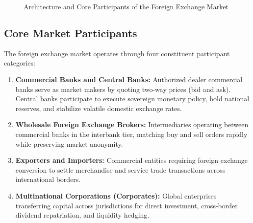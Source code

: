 \begin{figure}[htbp]
{%
    }
    \caption{Architecture and Core Participants of the Foreign Exchange Market}
    \label{fig:forex_market_structure}
\end{figure}

\subsection{Core Market Participants}
The foreign exchange market operates through four constituent participant categories:
\begin{enumerate}[leftmargin=*]
    \item \textbf{Commercial Banks and Central Banks:} Authorized dealer commercial banks serve as market makers by quoting two-way prices (bid and ask). Central banks participate to execute sovereign monetary policy, hold national reserves, and stabilize volatile domestic exchange rates.
    \item \textbf{Wholesale Foreign Exchange Brokers:} Intermediaries operating between commercial banks in the interbank tier, matching buy and sell orders rapidly while preserving market anonymity.
    \item \textbf{Exporters and Importers:} Commercial entities requiring foreign exchange conversion to settle merchandise and service trade transactions across international borders.
    \item \textbf{Multinational Corporations (Corporates):} Global enterprises transferring capital across jurisdictions for direct investment, cross-border dividend repatriation, and liquidity hedging.
\end{enumerate}

